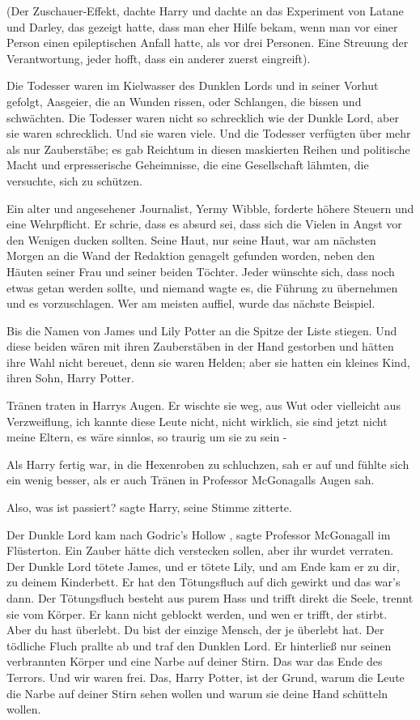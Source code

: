 (Der Zuschauer-Effekt, dachte Harry und dachte an
das Experiment von Latane und Darley, das gezeigt hatte, dass man eher Hilfe bekam, wenn man vor einer Person einen
epileptischen Anfall hatte, als vor drei Personen. Eine Streuung der Verantwortung, jeder hofft, dass ein anderer zuerst
eingreift).

Die Todesser waren im Kielwasser des Dunklen Lords und in seiner Vorhut gefolgt, Aasgeier, die
an Wunden rissen, oder Schlangen, die bissen und schwächten. Die Todesser waren nicht so schrecklich wie der Dunkle
Lord, aber sie waren schrecklich. Und sie waren viele. Und die Todesser verfügten über mehr als nur Zauberstäbe; es gab
Reichtum in diesen maskierten Reihen und politische Macht und erpresserische Geheimnisse, die eine Gesellschaft lähmten,
die versuchte, sich zu schützen.

Ein alter und angesehener Journalist, Yermy Wibble, forderte höhere Steuern
und eine Wehrpflicht. Er schrie, dass es absurd sei, dass sich die Vielen in Angst vor den Wenigen ducken sollten. Seine
Haut, nur seine Haut, war am nächsten Morgen an die Wand der Redaktion genagelt gefunden worden, neben den Häuten seiner
Frau und seiner beiden Töchter. Jeder wünschte sich, dass noch etwas getan werden sollte, und niemand wagte es, die
Führung zu übernehmen und es vorzuschlagen. Wer
 am meisten auffiel, wurde das nächste Beispiel.

Bis
die Namen von James und Lily Potter an die Spitze der Liste stiegen. Und diese beiden wären mit ihren Zauberstäben in
der Hand gestorben und hätten ihre Wahl nicht bereuet, denn sie waren Helden; aber sie hatten ein kleines Kind, ihren
Sohn, Harry Potter.

Tränen traten in Harrys Augen. Er wischte sie weg, aus Wut oder vielleicht aus
Verzweiflung, ich kannte diese Leute nicht, nicht wirklich, sie sind jetzt nicht meine Eltern, es wäre sinnlos, so
traurig um sie zu sein -

Als Harry fertig war, in die Hexenroben zu schluchzen, sah er auf und fühlte sich
ein wenig besser, als er auch Tränen in Professor McGonagalls Augen sah.

\glqq Also, was ist passiert?\grqq{}
sagte Harry, seine Stimme zitterte.

\glqq Der Dunkle Lord kam nach Godric's Hollow\grqq{} , sagte Professor
McGonagall im Flüsterton. \glqq Ein Zauber hätte dich verstecken sollen, aber ihr wurdet verraten. Der Dunkle Lord
tötete James, und er tötete Lily, und am Ende kam er zu dir, zu deinem Kinderbett. Er hat den Tötungsfluch auf dich
gewirkt und das war's dann. Der Tötungsfluch besteht aus purem Hass und trifft direkt die Seele, trennt sie vom Körper.
Er kann nicht geblockt werden, und wen er trifft, der stirbt. Aber du hast überlebt. Du bist der einzige Mensch, der je
überlebt hat. Der tödliche Fluch prallte ab und traf den Dunklen Lord. Er hinterließ nur seinen verbrannten Körper und
eine Narbe auf deiner Stirn. Das war das Ende des Terrors. Und wir waren frei. Das, Harry Potter, ist der Grund, warum
die Leute die Narbe auf deiner Stirn sehen wollen und warum sie deine Hand schütteln wollen.\grqq{}

